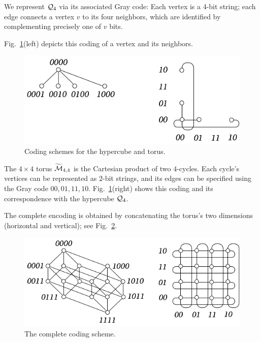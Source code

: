 \begin{itemize}
We represent $\mbox{$\cal Q$}_4$ via its associated Gray code:  Each vertex is a 4-bit string; each edge connects a vertex $v$  to its four neighbors, which are identified by complementing precisely one of $v$ bits.

Fig.~\ref{fig:IsomorphismCodingPrinciple}(left) depicts this coding of a vertex and its neighbors.
 \begin{figure}[hbt]
\begin{center}
       \includegraphics[scale=0.4]{FiguresGraph/IsomorphismEx2}
       \caption{Coding schemes for the hypercube and torus.}
  \label{fig:IsomorphismCodingPrinciple}
\end{center}
\end{figure}

\smallskip

The $4 \times 4$ torus $\widetilde{\mbox{$\cal M$}}_{4,4}$ is the Cartesian product of two $4$-cycles.  Each cycle's vertices can be represented as $2$-bit strings, and its edges can be specified using the Gray code $00, 01, 11, 10$.  Fig.~\ref{fig:IsomorphismCodingPrinciple}(right) shows this coding and its correspondence with the hypercube $\mbox{$\cal Q$}_4$. 

The complete encoding is obtained by concatenating the torus's two dimensions (horizontal and vertical); see Fig.~\ref{fig:IsomorphismCodingComplete}.
\begin{figure}[hbt]
\begin{center}
       \includegraphics[scale=0.4]{FiguresGraph/IsomorphismEx1}
       \caption{The complete coding scheme.}
  \label{fig:IsomorphismCodingComplete}
\end{center}
\end{figure}


\end{itemize}
